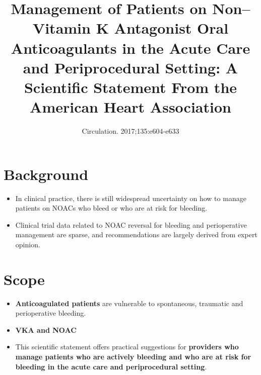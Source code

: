 \documentclass{article}
\title{Management of Patients on Non–Vitamin K Antagonist Oral Anticoagulants in the Acute Care and Periprocedural Setting: A Scientific Statement From the American Heart Association}
\author{Circulation. 2017;135:e604-e633}
\date{}
\begin{document}
\maketitle

\section{Background}
\begin{itemize}
	\item  In clinical practice, there is still widespread uncertainty on how to manage patients on NOACs who bleed or who are at risk for bleeding.
	\item Clinical trial data related to NOAC reversal for bleeding and perioperative management are sparse, and recommendations are largely derived from expert opinion.
\end{itemize}

\section{Scope}
\begin{itemize}
	\item \textbf{Anticoagulated patients} are vulnerable to spontaneous, traumatic and perioperative bleeding.
	\item \textbf{VKA and NOAC}
	\item  This scientific statement offers practical suggestions for \textbf{providers who manage patients who are actively bleeding and who are at risk for bleeding in the acute care and periprocedural setting}.
\end{itemize}
\end{document}
